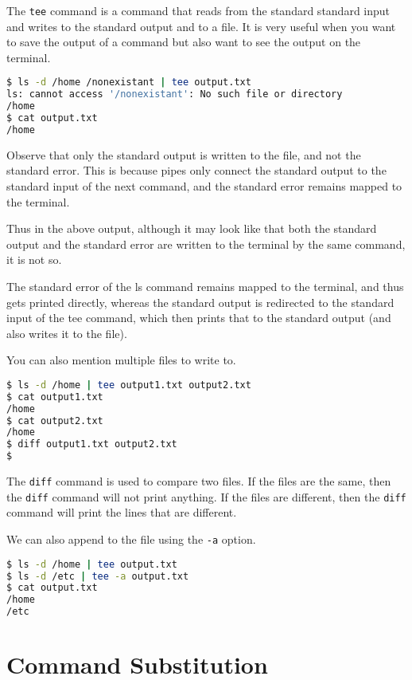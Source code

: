 The \lstinline|tee| command is a command that reads from the standard
standard input and writes to the standard output and to a file.
It is very useful when you want to save the output of a command
but also want to see the output on the terminal.

\begin{lstlisting}[language=bash]
$ ls -d /home /nonexistant | tee output.txt
ls: cannot access '/nonexistant': No such file or directory
/home
$ cat output.txt
/home
\end{lstlisting}

Observe that only the standard output is written to the file, and
not the standard error. This is because pipes only connect the
standard output to the standard input of the next command, and the
standard error remains mapped to the terminal.

Thus in the above output, although it may look like that both
the standard output and the standard error are written to the
terminal by the same command, it is not so.

The standard error of the ls command remains mapped to the terminal,
and thus gets printed directly, whereas the standard output is
redirected to the standard input of the tee command, which then
prints that to the standard output (and also writes it to the file).

You can also mention multiple files to write to.

\begin{lstlisting}[language=bash]
$ ls -d /home | tee output1.txt output2.txt
$ cat output1.txt
/home
$ cat output2.txt
/home
$ diff output1.txt output2.txt
$
\end{lstlisting}

\begin{remark}
  The \lstinline|diff| command is used to compare two files. If the
  files are the same, then the \lstinline|diff| command will not print
  anything. If the files are different, then the \lstinline|diff| command
  will print the lines that are different.
\end{remark}

We can also append to the file using the \lstinline|-a| option.

\begin{lstlisting}[language=bash]
$ ls -d /home | tee output.txt
$ ls -d /etc | tee -a output.txt
$ cat output.txt
/home
/etc
\end{lstlisting}

\section{Command Substitution}

